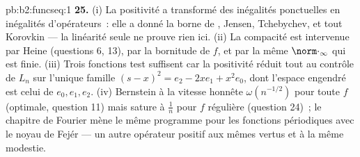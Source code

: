 \begin{solution}{pb:b2:funcseq:1}
\textbf{25.} (i) La positivité a transformé des inégalités
ponctuelles en inégalités d'opérateurs~: elle a donné la borne de
, Jensen, Tchebychev, et tout Korovkin --- la linéarité seule ne
prouve rien ici. (ii) La compacité est intervenue par Heine (questions
6, 13), par la bornitude de $f$, et par la  même
$\norm\cdot_\infty$ qui est finie. (iii) Trois fonctions test
suffisent car la positivité réduit tout au contrôle de
$L_n$ sur l'unique famille $(s-x)^2 = e_2 - 2xe_1 + x^2e_0$,
dont l'espace engendré est celui de $e_0, e_1, e_2$. (iv) Bernstein
 à la vitesse honnête $\omega(n^{-1/2})$ pour toute $f$
 (optimale, question 11) mais sature à $\frac1n$ pour $f$
régulière (question 24)~; le chapitre de Fourier mène le même
programme pour les fonctions périodiques avec le noyau de Fejér ---
un autre opérateur positif aux mêmes vertus et à la même modestie.
\end{solution}
